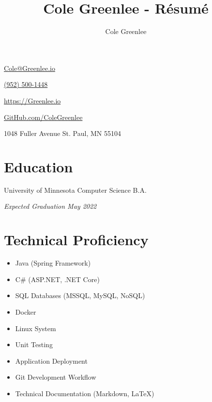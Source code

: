 \documentclass{article}
\title{Cole Greenlee - R\'esum\'e}
\author{Cole Greenlee}
\renewcommand{\maketitle}{
{\huge\bfseries\theauthor}
}
\begin{document}
\selectfont
\begin{multicols}{2}
\begin{description}[leftmargin=*]
\item\maketitle
\item\href{mailto:Cole@Greenlee.io}{Cole@Greenlee.io}
\item\href{tel:+19525001448}{(952) 500-1448}
\item\href{https://Greenlee.io}{https://Greenlee.io}
\item\href{https://GitHub.com/ColeGreenlee/}{GitHub.com/ColeGreenlee}
\item 1048 Fuller Avenue St. Paul, MN 55104
\end{description}
\end{multicols}

\section{Education}
\vspace{-1.5em}
\begin{multicols}{2}
\begin{flushleft}
University of Minnesota Computer Science B.A.
\end{flushleft}
\begin{flushright}
\textit{Expected Graduation May 2022}
\end{flushright}
\end{multicols}

\section{Technical Proficiency}
\vspace{-1.5em}
\begin{multicols}{2}
\begin{itemize}[leftmargin=*]
	\item Java (Spring Framework)
	\item C\# (ASP.NET, .NET Core)
	\item SQL Databases (MSSQL, MySQL, NoSQL)
	\item Docker
	\item Linux System
	\item Unit Testing
	\item Application Deployment
	\item Git Development Workflow
	\item Technical Documentation (Markdown, LaTeX)
\end{itemize}
\end{multicols}
\end{document}
